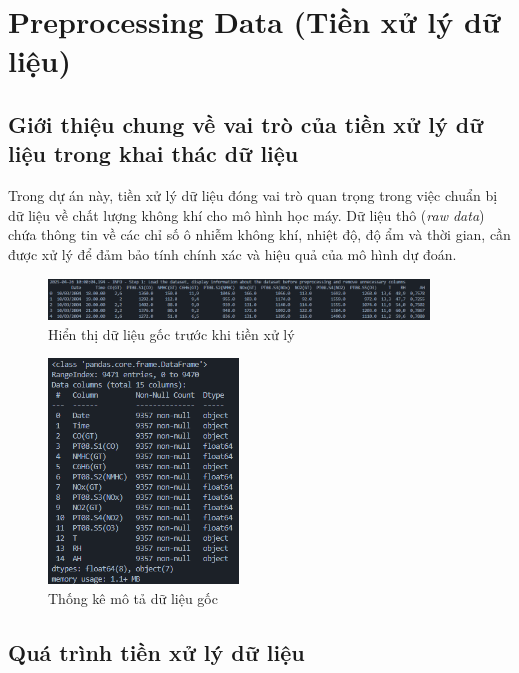 \section{Preprocessing Data (Tiền xử lý dữ liệu)}

\subsection{Giới thiệu chung về vai trò của tiền xử lý dữ liệu trong khai thác dữ liệu}

\hspace{0.5cm}Trong dự án này, tiền xử lý dữ liệu đóng vai trò quan trọng trong việc chuẩn bị dữ liệu về chất lượng không khí cho mô hình học máy. Dữ liệu thô (\textit{raw data}) chứa thông tin về các chỉ số ô nhiễm không khí, nhiệt độ, độ ẩm và thời gian, cần được xử lý để đảm bảo tính chính xác và hiệu quả của mô hình dự đoán.

\begin{figure}[htbp]
    \centering
    \includegraphics[width=0.9\textwidth]{images/raw_data_preview.png}
    \vspace{0.5cm}
    \caption{Hiển thị dữ liệu gốc trước khi tiền xử lý}
    \label{fig:raw_data_preview}
\end{figure}

\begin{figure}[htbp]
    \centering
    \includegraphics[width=0.45\textwidth]{images/raw_data_statistics.png}
    \vspace{0.5cm}
    \caption{Thống kê mô tả dữ liệu gốc}
    \label{fig:raw_data_statistics}
\end{figure}

\subsection{Quá trình tiền xử lý dữ liệu}

